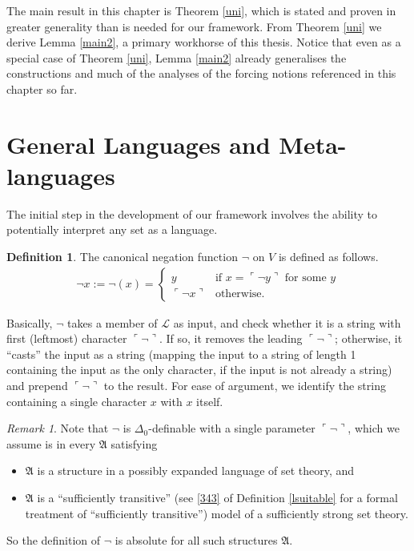 \documentclass[12pt, twoside]{memoir}
\numberwithin{equation}{section}
\theoremstyle{definition}
\newtheorem{defi}[thm]{Definition}
\theoremstyle{remark}
\newtheorem{rem}[thm]{Remark}
\theoremstyle{definition}
\theoremstyle{definition}
\theoremstyle{definition}
\theoremstyle{remark}
\begin{document}
The main result in this chapter is Theorem \ref{uni}, which is stated and proven in greater generality than is needed for our framework. From Theorem \ref{uni} we derive Lemma \ref{main2}, a primary workhorse of this thesis. Notice that even as a special case of Theorem \ref{uni}, Lemma \ref{main2} already generalises the constructions and much of the analyses of the forcing notions referenced in this chapter so far.

\section{General Languages and Meta-languages}

The initial step in the development of our framework involves the ability to potentially interpret any set as a language. 

\begin{defi}\label{neg}
The canonical negation function $\neg$ on $V$ is defined as follows. 
\begin{align*}
    \neg x := \neg(x) = 
    \begin{cases}
        y & \text{if } x = \ulcorner \neg y \urcorner \text{ for some } y \\
        \ulcorner \neg x \urcorner & \text{otherwise}.
    \end{cases}
\end{align*}
\end{defi}

Basically, $\neg$ takes a member of $\mathcal{L}$ as input, and check whether it is a string with first (leftmost) character $\ulcorner \neg \urcorner$. If so, it removes the leading $\ulcorner \neg \urcorner$; otherwise, it ``casts'' the input as a string (mapping the input to a string of length 1 containing the input as the only character, if the input is not already a string) and prepend $\ulcorner \neg \urcorner$ to the result. For ease of argument, we identify the string containing a single character $x$ with $x$ itself. 

\begin{rem}\label{rem32}
Note that $\neg$ is $\Delta_0$-definable with a single parameter $\ulcorner \neg \urcorner$, which we assume is in every $\mathfrak{A}$ satisfying
\begin{itemize}
    \item $\mathfrak{A}$ is a structure in a possibly expanded language of set theory, and
    \item $\mathfrak{A}$ is a ``sufficiently transitive'' (see \ref{343} of Definition \ref{lsuitable} for a formal treatment of ``sufficiently transitive'') model of a sufficiently strong set theory.
\end{itemize} 
So the definition of $\neg$ is absolute for all such structures $\mathfrak{A}$.
\end{rem}
\end{document}
